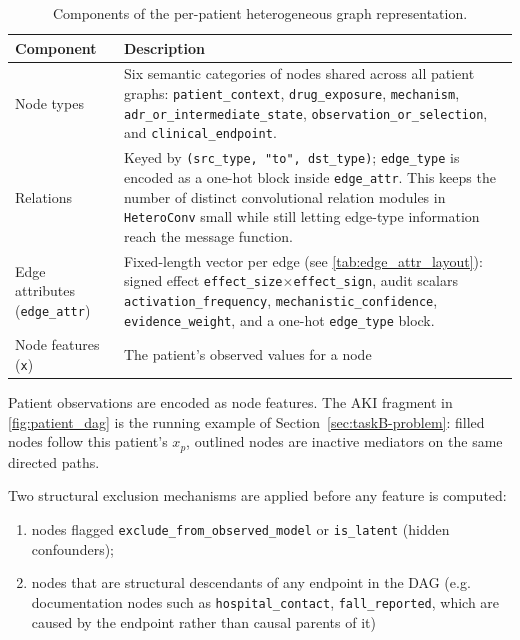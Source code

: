 \begin{table}[H]
    \centering
    \caption{Components of the per-patient heterogeneous graph representation.}
    \label{tab:heterodata_components}
    \begin{tabularx}{\textwidth}{@{}l X@{}}
        \toprule
        \textbf{Component} & \textbf{Description} \\
        \midrule
        Node types &
        Six semantic categories of nodes shared across all patient graphs: \texttt{patient\_context}, \texttt{drug\_exposure}, \texttt{mechanism}, \texttt{adr\_or\_intermediate\_state}, \texttt{observation\_or\_selection}, and \texttt{clinical\_endpoint}. \\
        \addlinespace
        Relations &
        Keyed by \texttt{(src\_type, "to", dst\_type)};
        \texttt{edge\_type} is encoded as a one-hot block inside
        \texttt{edge\_attr}. This keeps the number of distinct convolutional
        relation modules in \texttt{HeteroConv} small while still letting
        edge-type information reach the message function. \\
        \addlinespace
        Edge attributes (\texttt{edge\_attr}) &
        Fixed-length vector per edge (see \cref{tab:edge_attr_layout}): signed
        effect \texttt{effect\_size}$\times$\texttt{effect\_sign}, audit scalars
        \texttt{activation\_frequency}, \texttt{mechanistic\_confidence},
        \texttt{evidence\_weight}, and a one-hot \texttt{edge\_type} block. \\
        \addlinespace
        Node features (\texttt{x}) &
        The patient's observed values for a node \\
        \bottomrule
    \end{tabularx}
\end{table}

Patient observations are encoded as node features.
The AKI fragment in \cref{fig:patient_dag} is the running example of
Section~\ref{sec:taskB-problem}: filled nodes follow this patient's $x_p$,
outlined nodes are inactive mediators on the same directed paths.

Two structural exclusion mechanisms are applied before any feature is computed: 
\begin{enumerate}[label=\alph*)]
    \item nodes flagged \texttt{exclude\_from\_observed\_model} or \texttt{is\_latent} (hidden confounders); 
    \item nodes that are structural descendants of any endpoint in the DAG (e.g. documentation nodes such as 
    \texttt{hospital\_contact}, \texttt{fall\_reported}, which are caused by the endpoint rather than causal parents of it)
\end{enumerate}

